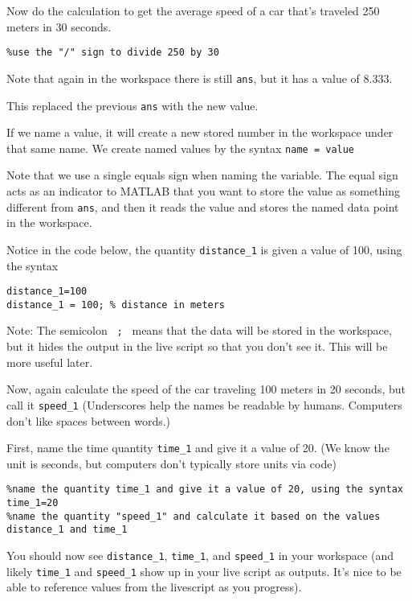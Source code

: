 \documentclass{ximera}
\begin{document}
\begin{example}
Now do the calculation to get the average speed of a car that's traveled 250 meters in 30 seconds.

\begin{verbatim}
%use the "/" sign to divide 250 by 30
\end{verbatim}

\begin{remark}
Note that again in the workspace there is still \texttt{ans}, but it has a value of 8.333.
\end{remark}

This replaced the previous \texttt{ans} with the new value.
\end{example}

If we name a value, it will create a new stored number in the workspace under that same name. We create named values by the syntax \texttt{name = value}

\begin{remark}
Note that we use a single equals sign when naming the variable. The equal sign acts as an indicator to MATLAB that you want to store the value as something different from \texttt{ans}, and then it reads the value and stores the named data point in the workspace.
\end{remark}

Notice in the code below, the quantity \texttt{distance\_1} is given a value of 100, using the syntax

\begin{verbatim}
distance_1=100
distance_1 = 100; % distance in meters
\end{verbatim}

\begin{remark}
Note: The semicolon \texttt{ ; } means that the data will be stored in the workspace, but it hides the output in the live script so that you don't see it. This will be more useful later.
\end{remark}

\begin{example}
Now, again calculate the speed of the car traveling 100 meters in 20 seconds, but call it \texttt{speed\_1} (Underscores help the names be readable by humans. Computers don't like spaces between words.)

First, name the time quantity \texttt{time\_1} and give it a value of 20. (We know the unit is seconds, but computers don't typically store units via code)

\begin{verbatim}
%name the quantity time_1 and give it a value of 20, using the syntax time_1=20
%name the quantity "speed_1" and calculate it based on the values distance_1 and time_1
\end{verbatim}

You should now see \texttt{distance\_1}, \texttt{time\_1}, and \texttt{speed\_1} in your workspace (and likely \texttt{time\_1} and \texttt{speed\_1} show up in your live script as outputs. It's nice to be able to reference values from the livescript as you progress).
\end{example}
\end{document}
